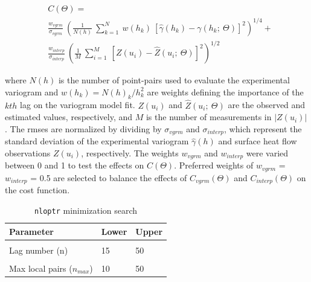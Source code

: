 \begin{equation}
  \begin{aligned}
    &C(\Theta) = \\
    &\frac{w_{vgrm}}{\sigma_{vgrm}}\ \left(\frac{1}{N(h)}\ \sum_{k=1}^{N}\ w(h_k)\ [\hat{\gamma}(h_k)-\gamma(h_k;\ \Theta)]^2\right)^{1/4} + \\
    &\frac{w_{interp}}{\sigma_{interp}}\ \left(\frac{1}{M}\ \sum_{i=1}^{M}\ [Z(u_i)-\hat{Z}(u_i;\ \Theta)]^2\right)^{1/2}
  \end{aligned}
  \label{eq:costExp}
\end{equation}

where \(N(h)\) is the number of point-pairs used to evaluate the experimental variogram and \(w(h_k) = N(h)_k/h_k^2\) are weights defining the importance of the \(kth\) lag on the variogram model fit. \(Z(u_i)\) and \(\hat{Z}(u_i;\ \Theta)\) are the observed and estimated values, respectively, and \(M\) is the number of measurements in \(|Z(u_i)|\). The \glspl{rmse} are normalized by dividing by \(\sigma_{vgrm}\) and \(\sigma_{interp}\), which represent the standard deviation of the experimental variogram \(\hat{\gamma}(h)\) and surface heat flow observations \(Z(u_i)\), respectively. The weights \(w_{vgrm}\) and \(w_{interp}\) were varied between 0 and 1 to test the effects on \(C(\Theta)\). Preferred weights of \(w_{vgrm}\) = \(w_{interp}\) = 0.5 are selected to balance the effects of \(C_{vgrm}(\Theta)\) and \(C_{interp}(\Theta)\) on the cost function.

\begin{table}

\caption{\label{tab:nloptrBounds}\texttt{nloptr} minimization search}
\centering
\begin{tabular}[t]{lll}
\toprule
Parameter & Lower & Upper\\
\midrule
\cellcolor{gray!6}{Lag cutoff (c)} & \cellcolor{gray!6}{1} & \cellcolor{gray!6}{20}\\
Lag number (n) & 15 & 50\\
\cellcolor{gray!6}{Lag shift (l)} & \cellcolor{gray!6}{1} & \cellcolor{gray!6}{10}\\
Max local pairs ($n_{max}$) & 10 & 50\\
\bottomrule
\end{tabular}
\end{table}

